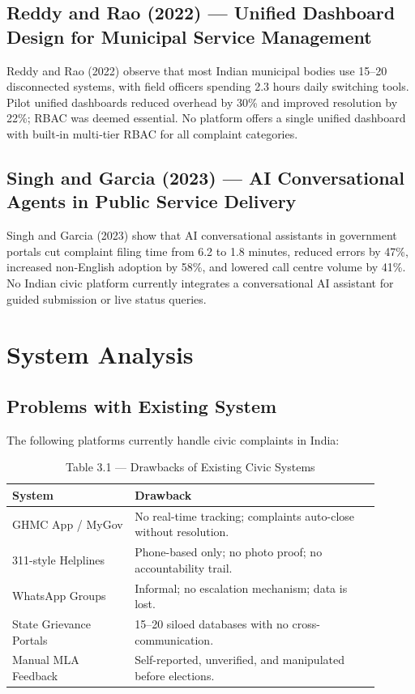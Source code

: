 \documentclass[12pt,a4paper]{report}
\begin{document}
\section{Reddy and Rao (2022) --- Unified Dashboard Design for Municipal Service Management}

Reddy and Rao (2022) observe that most Indian municipal bodies use 15–20 disconnected systems, with field officers spending 2.3 hours daily switching tools. Pilot unified dashboards reduced overhead by 30\% and improved resolution by 22\%; RBAC was deemed essential. No platform offers a single unified dashboard with built‑in multi‑tier RBAC for all complaint categories.

\section{Singh and Garcia (2023) --- AI Conversational Agents in Public Service Delivery}

Singh and Garcia (2023) show that AI conversational assistants in government portals cut complaint filing time from 6.2 to 1.8 minutes, reduced errors by 47\%, increased non‑English adoption by 58\%, and lowered call centre volume by 41\%. No Indian civic platform currently integrates a conversational AI assistant for guided submission or live status queries.

\chapter{System Analysis}

\section{Problems with Existing System}

The following platforms currently handle civic complaints in India:

\begin{table}[h]
\centering
\caption{Table 3.1 --- Drawbacks of Existing Civic Systems}
\vspace{0.4em}
\begin{tabular}{p{0.30\linewidth} p{0.60\linewidth}}
\toprule
\textbf{System} & \textbf{Drawback} \\
\midrule
GHMC App / MyGov & No real-time tracking; complaints auto-close without
resolution. \\[0.4em]
311-style Helplines & Phone-based only; no photo proof; no accountability
trail. \\[0.4em]
WhatsApp Groups & Informal; no escalation mechanism; data is lost. \\[0.4em]
State Grievance Portals & 15--20 siloed databases with no
cross-communication. \\[0.4em]
Manual MLA Feedback & Self-reported, unverified, and manipulated before
elections. \\
\bottomrule
\end{tabular}
\end{table}
\end{document}
